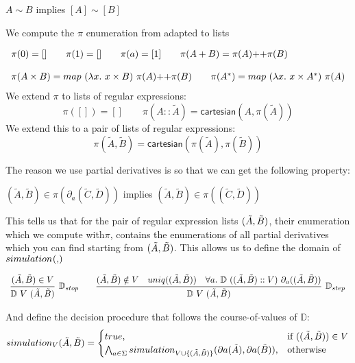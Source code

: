 \documentclass[a4paper,UKenglish,cleveref, autoref, thm-restate]{lipics-v2021}
\newcommand\mycomment[1]{}
\begin{document}
\begin{lemma}
$A \sim B$  implies $[A] \sim [B]$
\end{lemma}
\mycomment{actually the code only uses the partial one, goes directly from language containment I think}
We compute the $\pi$ enumeration from \cite{CZ01} adapted to lists
\begin{definition}[Enumeration]
  \begin{displaymath}
    \begin{array}{lll}
  \pi(0) = [] \qquad \pi(1) = [] \qquad \pi(a) = [1] \qquad \pi(A + B) = \cat{\pi(A)}{\pi(B)} \\\\
  \pi(A \times B) = \cat{\mymap{\lambda x.~x \times B}{\pi(A)}}{\pi(B)} \qquad \pi(A^*) = \mymap{\lambda x.~x \times A^*}{\pi(A)}
    \end{array}
  \end{displaymath}
We extend $\pi$ to lists of regular expressions:
\[\pi([])=[] \qquad \pi(A::\tilde{A}) = \mathsf{cartesian}(A,\pi(\tilde{A}))\]
We extend this to a pair of lists of regular expressions:
\[\pi(\tilde{A},\tilde{B})= \mathsf{cartesian}(\pi(\tilde{A}),\pi(\tilde{B}))\]
\end{definition}
The reason we use partial derivatives is so that we can get the following property:
\begin{lemma}[Closure]\label{lem:closure}
 $(\tilde{A},\tilde{B}) \in \pi(\partial_a(\tilde{C},\tilde{D}))$ implies  $(\tilde{A},\tilde{B}) \in \pi((\tilde{C},\tilde{D}))$ 
\end{lemma}
This tells us that for the pair of regular expression lists $(\tilde{A},\tilde{B})$, their enumeration which we compute with$\pi$, contains the enumerations of all partial derivatives which you can find starting from $(\tilde{A},\tilde{B})$. This allows us to define the domain of $\simulationb{}{}$
\begin{definition}[Domain]
  \begin{displaymath}
    \begin{array}{lll}
      \infer[\mathbb{D}_{stop}]{\domm{V}{\pder{A}{B}}}{\pder{A}{B} \in V} \qquad \infer[\mathbb{D}_{step}]{\domm{V}{\pder{A}{B}}}{\pder{A}{B} \notin V & \mathsf{uniq}(\pder{A}{B}) & \forall a.~\domm{(\pder{A}{B}::V)}{\partial_a(\pder{A}{B})}}
    \end{array}
  \end{displaymath}
\end{definition}
And define the decision procedure that follows the course-of-values of $\mathbb{D}$:
\begin{align}
\simulationb{V}{\tilde{A}}{\tilde{B}} =\begin{cases}
			\true, & \text{if }(\pder{A}{B}) \in V\\
                      \bigwedge_{a \in \Sigma}\simulationb{V \cup \{\pder{A}{B}\}}{\mypar{a}{\tilde{A}}}{\mypar{a}{\tilde{B}}}, & \text{otherwise}
		 \end{cases}
\end{align}
\end{document}

